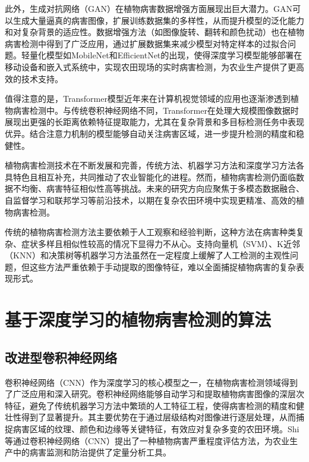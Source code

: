 此外，生成对抗网络（GAN）在植物病害数据增强方面展现出巨大潜力。GAN可以生成大量逼真的病害图像，扩展训练数据集的多样性，从而提升模型的泛化能力和对复杂背景的适应性。数据增强方法（如图像旋转、翻转和颜色扰动）也在植物病害检测中得到了广泛应用，通过扩展数据集来减少模型对特定样本的过拟合问题。轻量化模型如MobileNet和EfficientNet的出现，使得深度学习模型能够部署在移动设备和嵌入式系统中，实现农田现场的实时病害检测，为农业生产提供了更高效的技术支持。

值得注意的是，Transformer模型近年来在计算机视觉领域的应用也逐渐渗透到植物病害检测中。与传统卷积神经网络不同，Transformer在处理大规模图像数据时展现出更强的长距离依赖特征提取能力，尤其在复杂背景和多目标检测任务中表现优异。结合注意力机制的模型能够自动关注病害区域，进一步提升检测的精度和稳健性。

植物病害检测技术在不断发展和完善，传统方法、机器学习方法和深度学习方法各具特色且相互补充，共同推动了农业智能化的进程。然而，植物病害检测仍面临数据不均衡、病害特征相似性高等挑战。未来的研究方向应聚焦于多模态数据融合、自监督学习和联邦学习等前沿技术，以期在复杂农田环境中实现更精准、高效的植物病害检测。

传统的植物病害检测方法主要依赖于人工观察和经验判断，这种方法在病害种类复杂、症状多样且相似性较高的情况下显得力不从心。支持向量机（SVM）、K近邻（KNN）和决策树等机器学习方法虽然在一定程度上缓解了人工检测的主观性问题，但这些方法严重依赖于手动提取的图像特征，难以全面捕捉植物病害的复杂表现形式\cite{8}。

\section{基于深度学习的植物病害检测的算法}
\subsection{改进型卷积神经网络}
卷积神经网络（CNN）作为深度学习的核心模型之一，在植物病害检测领域得到了广泛应用和深入研究。卷积神经网络能够自动学习和提取植物病害图像的深层次特征，避免了传统机器学习方法中繁琐的人工特征工程，使得病害检测的精度和健壮性得到了显著提升。其主要优势在于通过层级结构对图像进行逐层处理，从而捕捉病害区域的纹理、颜色和边缘等关键特征，有效应对复杂多变的农田环境。Shi等\cite{15}通过卷积神经网络（CNN）提出了一种植物病害严重程度评估方法，为农业生产中的病害监测和防治提供了定量分析工具。

